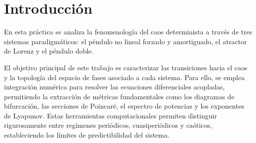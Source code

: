 \section{Introducción}

En esta práctica se analiza la fenomenología del caos determinista a través de tres sistemas paradigmáticos: el péndulo no lineal forzado y amortiguado, el atractor de Lorenz y el péndulo doble.

El objetivo principal de este trabajo es caracterizar las transiciones hacia el caos y la topología del espacio de fases asociado a cada sistema. Para ello, se emplea integración numérica para resolver las ecuaciones diferenciales acopladas, permitiendo la extracción de métricas fundamentales como los diagramas de bifurcación, las secciones de Poincaré, el espectro de potencias y los exponentes de Lyapunov. Estas herramientas computacionales permiten distinguir rigurosamente entre regímenes periódicos, cuasiperiódicos y caóticos, estableciendo los límites de predictibilidad del sistema.